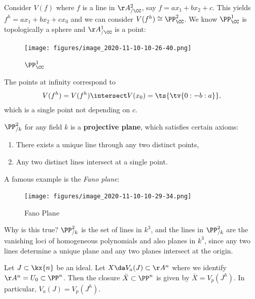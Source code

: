 \begin{example}[?]

Consider \(V(f)\) where \(f\) is a line in \(\AA^2_{/\CC}\), say
\(f = ax_1 + bx_2 + c\). This yields \(f^h = ax_1 + bx_2 + cx_0\) and we
can consider \(V(f^h) \cong \PP^2_{\CC}\). We know \(\PP^1_{\CC}\) is
topologically a sphere and \(\AA^1_{/\CC}\) is a point:

\begin{figure}
\centering
\texttt{[image: figures/image\_2020-11-10-10-26-40.png]}
\caption{\(\PP^1_{\CC}\)}
\end{figure}

The points at infinity correspond to
\begin{align*}  
V(f^h) = V(f^h) \intersect V(x_0) = \ts{\tv{0:-b:a}}
,\end{align*} which is a single point not depending on \(c\).

\end{example}

\begin{remark}

\(\PP^2_{/k}\) for any field \(k\) is a \textbf{projective plane}, which
satisfies certain axioms:

\begin{enumerate}
\def\labelenumi{\arabic{enumi}.}
\item
  There exists a unique line through any two distinct points,
\item
  Any two distinct lines intersect at a single point.
\end{enumerate}

A famous example is the \emph{Fano plane}:

\begin{figure}
\centering
\texttt{[image: figures/image\_2020-11-10-10-29-34.png]}
\caption{Fano Plane}
\end{figure}

Why is this true? \(\PP^2_{/k}\) is the set of lines in \(k^3\), and the
lines in \(\PP^2_{/k}\) are the vanishing loci of homogeneous
polynomials and also planes in \(k^3\), since any two lines determine a
unique plane and any two planes intersect at the origin.

\end{remark}

\begin{proposition}[?]

Let \(J\subset \kx{n}\) be an ideal. Let \(X \da V_a(J) \subset \AA^n\)
where we identify \(\AA^n = U_0 \subset \PP^n\). Then the closure
\(\bar{X} \subset \PP^n\) is given by \(\bar{X} = V_p(J^h)\). In
particular, \(V_a(J) = V_p(J^h)\).

\end{proposition}

